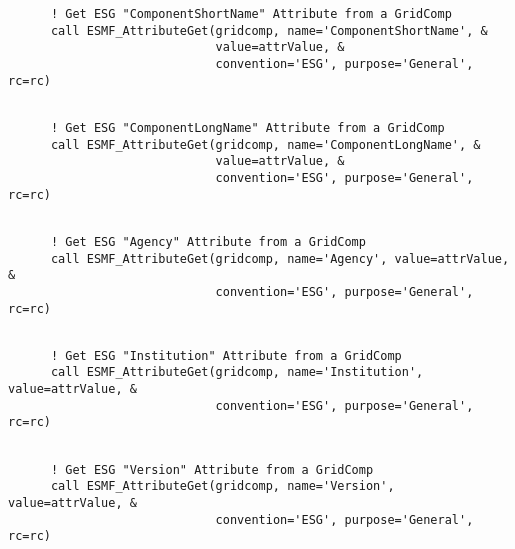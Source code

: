  \begin{verbatim}
      ! Get ESG "ComponentShortName" Attribute from a GridComp
      call ESMF_AttributeGet(gridcomp, name='ComponentShortName', &
                             value=attrValue, &
                             convention='ESG', purpose='General', rc=rc)
 
\end{verbatim}
 

 \begin{verbatim}
      ! Get ESG "ComponentLongName" Attribute from a GridComp
      call ESMF_AttributeGet(gridcomp, name='ComponentLongName', &
                             value=attrValue, &
                             convention='ESG', purpose='General', rc=rc)
 
\end{verbatim}
 

 \begin{verbatim}
      ! Get ESG "Agency" Attribute from a GridComp
      call ESMF_AttributeGet(gridcomp, name='Agency', value=attrValue, &
                             convention='ESG', purpose='General', rc=rc)
 
\end{verbatim}
 

 \begin{verbatim}
      ! Get ESG "Institution" Attribute from a GridComp
      call ESMF_AttributeGet(gridcomp, name='Institution', value=attrValue, &
                             convention='ESG', purpose='General', rc=rc)
 
\end{verbatim}
 

 \begin{verbatim}
      ! Get ESG "Version" Attribute from a GridComp
      call ESMF_AttributeGet(gridcomp, name='Version', value=attrValue, &
                             convention='ESG', purpose='General', rc=rc)
 
\end{verbatim}
 

